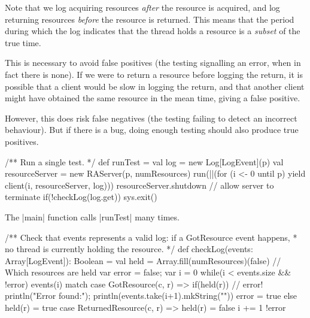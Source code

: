 \begin{slide}

Note that we log acquiring resources \emph{after} the resource is acquired,
and log returning resources \emph{before} the resource is returned.  This
means that the period during which the log indicates that the thread holds a
resource is a \emph{subset} of the true time.

This is necessary to avoid false positives (the testing signalling an error,
when in fact there is none).  If we were to return a resource before logging
the return, it is possible that a client would be slow in logging the return,
and that another client might have obtained the same resource in the mean
time, giving a false positive.

However, this does risk false negatives (the testing failing to detect an
incorrect behaviour).  But if there is a bug, doing enough testing should also
produce true positives. 
\end{slide}


\begin{slide}

\begin{scala}
  /** Run a single test. */
  def runTest = {
    val log = new Log[LogEvent](p)
    val resourceServer = new RAServer(p, numResources)
    run(||(for (i <- 0 until p) yield client(i, resourceServer, log)))
    resourceServer.shutdown        // allow server to terminate
    if(!checkLog(log.get)) sys.exit()
  }
\end{scala}

The |main| function calls |runTest| many times. 
\end{slide}


\begin{slide}
\begin{scala}
  /** Check that events represents a valid log: if a GotResource event happens,
    * no thread is currently holding the resource. */
  def checkLog(events: Array[LogEvent]): Boolean = {
    val held = Array.fill(numResources)(false)  // Which resources are held
    var error = false; var i = 0
    while(i < events.size && !error){
      events(i) match{
        case GotResource(c, r) =>
          if(held(r)){ // error!
            println("Error found:"); println(events.take(i+1).mkString("\n"))
            error = true
          }
          else held(r) = true
        case ReturnedResource(c, r) => held(r) = false
      }
      i += 1
    }
    !error
  }
\end{scala}
\end{slide}

